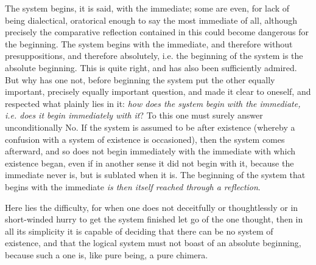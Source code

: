 \documentclass[12pt,a4paper,openany]{book}
\newcommand{\opage}[1]{\marginnote{\footnotesize\textit{[#1]}}}
\begin{document}
The system begins, it is said, with the immediate; some are even, for lack of being
dialectical, oratorical enough to say the most immediate of all, although precisely
the comparative reflection contained in this could become dangerous for the
beginning. The system begins with the immediate, and therefore without presuppositions,
and therefore absolutely, i.e. the beginning of the system is the absolute beginning.
This is quite right, and has also been sufficiently admired. But why has one not,
before beginning the system
\setcounter{footnote}{0}%
\opage{173}put the other equally important, precisely equally important question, and made it
clear to oneself, and respected what plainly lies in it: \emph{how does the system begin}
\emph{with the immediate, i.e. does it begin immediately
with it}? To this one must surely answer unconditionally No. If the system is assumed
to be after existence (whereby a confusion with a system of existence is occasioned),
then the system comes afterward, and so does not begin immediately with the immediate
with which existence began, even if in another sense it did not begin with it, because
the immediate never is, but is sublated when it is. The beginning of the system that
begins with the immediate \emph{is then itself reached through a reflection}.

Here lies the difficulty, for when one does not deceitfully or thoughtlessly or in
short-winded hurry to get the system finished let go of the one thought, then in all
its simplicity it is capable of deciding that there can be no system of existence,
and that the logical system must not boast of an absolute beginning, because such a
one is, like pure being, a pure chimera.
\end{document}
